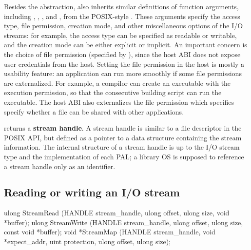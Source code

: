 Besides the abstraction,
also inherits similar definitions of function arguments,
including , , , and ,
from the POSIX-style .
These arguments specify the access type, file permission, creation mode, and other miscellaneous options of the I/O streams:
for example, the access type can be specified as readable or writable,
and the creation mode can be either explicit or implicit.
An important concern is the choice of file permission (specified by ), since the host ABI does not expose user credentials
from the host.
Setting the file permission in the host
is mostly a usability feature: 
an application can run more smoothly if some file permissions are externalized.
For example, a compilor can create an executable with the execution permission, so that the consecutive building script can run the executable.
The host ABI also externalizes the file permission
which specifies specify whether a file can be shared with other applications.


 returns a {\bf stream handle}. A stream handle is similar to a file descriptor in the POSIX API,
but defined as a pointer to a data structure containing the stream information.
The internal structure of a stream handle is up to the I/O stream type and the implementation of each PAL;
a library OS is supposed to reference a stream handle
only as an identifier.




\subsection*{Reading or writing an I/O stream}



\begin{paldef}
ulong StreamRead  (HANDLE stream_handle, ulong offset,
                   ulong size, void *buffer);
ulong StreamWrite (HANDLE stream_handle, ulong offset,
                   ulong size, const void *buffer);
void *StreamMap   (HANDLE stream_handle,
                   void *expect_addr, uint protection,
                   ulong offset, ulong size);
\end{paldef}



